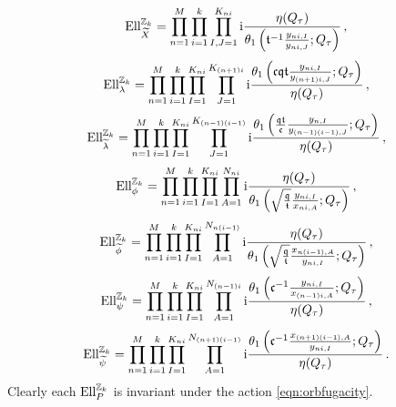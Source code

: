\documentclass[main.tex]{subfiles}
\begin{document}
\begin{equation}
\textrm{Ell}^{\mathbb{Z}_k}_{\widetilde{X}}=\prod_{n=1}^M\prod_{i=1}^k\prod_{I,J=1}^{K_{ni}}\mathrm{i}\frac{\eta(Q_{\tau})}{\theta_1\left(\mathfrak{t}^{-1}\frac{y_{ni,I}}{y_{ni,J}};Q_{\tau}\right)}\,,
\end{equation}
\begin{equation}
\textrm{Ell}^{\mathbb{Z}_k}_{\lambda}=\prod_{n=1}^M\prod_{i=1}^k\prod_{I=1}^{K_{ni}}\prod_{J=1}^{K_{(n+1)i}}\mathrm{i}\frac{\theta_1\left(\mathfrak{c}\mathfrak{q}\mathfrak{t}\frac{y_{ni,I}}{y_{(n+1)i,J}};Q_{\tau}\right)}{\eta(Q_{\tau})}\,,
\end{equation}
\begin{equation}
\textrm{Ell}^{\mathbb{Z}_k}_{\widetilde{\lambda}}=\prod_{n=1}^M\prod_{i=1}^k\prod_{I=1}^{K_{ni}}\prod_{J=1}^{K_{(n-1)(i-1)}}\mathrm{i}\frac{\theta_1\left(\frac{\mathfrak{q}\mathfrak{t}}{\mathfrak{c}}\frac{y_{n,I}}{y_{(n-1)(i-1),J}};Q_{\tau}\right)}{\eta(Q_{\tau})}\,,
\end{equation}
\begin{equation}
\textrm{Ell}^{\mathbb{Z}_k}_{\phi}=\prod_{n=1}^M\prod_{i=1}^k\prod_{I=1}^{K_{ni}}\prod_{A=1}^{N_{ni}}\mathrm{i}\frac{\eta(Q_{\tau})}{\theta_1\left(\sqrt{\frac{\mathfrak{q}}{\mathfrak{t}}}\frac{y_{ni,I}}{x_{ni,A}};Q_{\tau}\right)}\,,
\end{equation}
\begin{equation}
\textrm{Ell}^{\mathbb{Z}_k}_{\widetilde{\phi}}=\prod_{n=1}^M\prod_{i=1}^k\prod_{I=1}^{K_{ni}}\prod_{A=1}^{N_{n(i-1)}}\mathrm{i}\frac{\eta(Q_{\tau})}{\theta_1\left(\sqrt{\frac{\mathfrak{q}}{\mathfrak{t}}}\frac{x_{n(i-1),A}}{y_{ni,I}};Q_{\tau}\right)}\,,
\end{equation}
\begin{equation}
\textrm{Ell}^{\mathbb{Z}_k}_{\psi}=\prod_{n=1}^M\prod_{i=1}^k\prod_{I=1}^{K_{ni}}\prod_{A=1}^{N_{(n-1)i}}\mathrm{i}\frac{\theta_1\left(\mathfrak{c}^{-1}\frac{y_{ni,I}}{x_{(n-1)i,A}};Q_{\tau}\right)}{\eta(Q_{\tau})}\,,
\end{equation}
\begin{equation}
\textrm{Ell}^{\mathbb{Z}_k}_{\widetilde{\psi}}=\prod_{n=1}^M\prod_{i=1}^k\prod_{I=1}^{K_{ni}}\prod_{A=1}^{N_{(n+1)(i-1)}}\mathrm{i}\frac{\theta_1\left(\mathfrak{c}^{-1}\frac{x_{(n+1)(i-1),A}}{y_{ni,I}};Q_{\tau}\right)}{\eta(Q_{\tau})}\,.
\end{equation}
Clearly each $\textrm{Ell}_{P}^{\mathbb{Z}_k}$ is invariant under the action \eqref{eqn:orbfugacity}.
\end{document}
